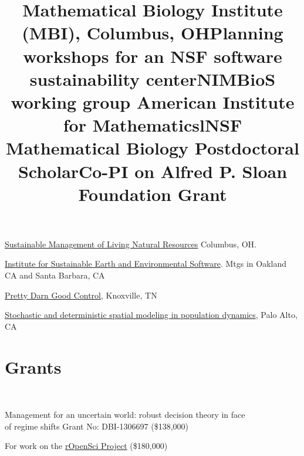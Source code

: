 \documentclass[margin]{res}
\begin{document}
\begin{resume}
\title{Mathematical Biology Institute (MBI), Columbus, OH}
\begin{position}
\href{http://www.mbi.ohio-state.edu/2013/ws3description.html}{Sustainable Management of Living Natural Resources} Columbus, OH.  
\vspace{-.25cm}
\end{position}

\title{Planning workshops for an NSF software sustainability center}
\begin{position}
\href{http://isees.nceas.ucsb.edu}{Institute for Sustainable Earth and Environmental Software}. Mtgs in Oakland CA and Santa Barbara, CA
\vspace{-.25cm}
\end{position}



\title{NIMBioS working group }
\begin{position}
\href{http://www.nimbios.org/workinggroups/WG_PDG}{Pretty Darn Good Control}, Knoxville, TN  
\vspace{-.25cm}
\end{position}

\title{American Institute for Mathematics}
\begin{position}
 \href{http://www.aimath.org/WWN/populationmodel}{Stochastic and deterministic spatial modeling in population dynamics}, Palo Alto, CA  \vspace{-.25cm}
\end{position}

 
\section{Grants}
\begin{format}
\title{l} \\
\body
\end{format}

\title{\textbf{NSF} Mathematical Biology Postdoctoral Scholar}
\begin{position}
  Management for an uncertain world: robust decision theory in face \\
  of regime shifts Grant No:  DBI-1306697 (\$138,000)
  \vspace{-.25cm}
\end{position}

\title{Co-PI on \textbf{Alfred P. Sloan Foundation} Grant}
\begin{position}
  For work on the \href{http://ropensci.org}{rOpenSci Project}  (\$180,000)
  \vspace{-.25cm}
\end{position}


\end{resume}
\end{document}

